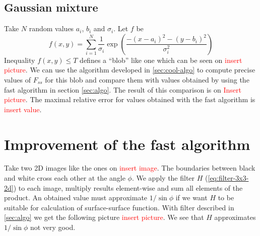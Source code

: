 \documentclass[reprint,amsmath,amssymb,aps,pre,showkeys,showpacs]{revtex4-1}
\begin{document}
\subsection{Gaussian mixture}
\label{sec:gauss}
Take $N$ random values $a_i$, $b_i$ and $\sigma_i$. Let $f$ be
\begin{equation*}
  f(x,y) = \sum_{i=1}^N \frac{1}{\sigma_i} \exp(\frac{-(x-a_i)^2-(y-b_i)^2}{\sigma_i^2})
\end{equation*}
Inequality $f(x,y) \le T$ defines a ``blob'' like one which can be seen on
\textcolor{red}{insert picture}. We can use the algorithm developed in
\cref{sec:cool-algo} to compute precise values of $F_{ss}$ for this blob and
compare them with values obtained by using the fast algorithm in section
\cref{sec:algo}. The result of this comparison is on \textcolor{red}{Insert
  picture}. The maximal relative error for values obtained with the fast
algorithm is \textcolor{red}{insert value}.

\section{Improvement of the fast algorithm}
\label{sec:improvement}
Take two 2D images like the ones on \textcolor{red}{insert image}. The
boundaries between black and white cross each other at the angle $\phi$. We
apply the filter $H$ (\cref{eq:filter-3x3-2d}) to each image, multiply results
element-wise and sum all elements of the product. An obtained value must
approximate $1/\sin \phi$ if we want $H$ to be suitable for calculation of
surface-surface function. With filter described in \cref{sec:algo} we get the
following picture \textcolor{red}{insert picture}. We see that $H$ approximates
$1/\sin \phi$ not very good.
\end{document}
